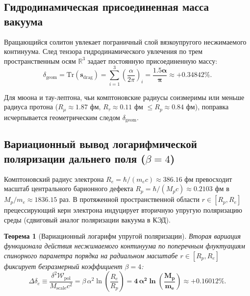 \documentclass[12pt,a4paper]{article}
\newtheorem{theorem}{Теорема}
\begin{document}
	\subsection{Гидродинамическая присоединенная масса вакуума}
	Вращающийся солитон увлекает пограничный слой вязкоупругого несжимаемого континуума. След тензора гидродинамического увлечения по трем пространственным осям $\mathbb{R}^3$ задает постоянную присоединенную массу:
	\begin{equation}
		\delta_{\text{geom}} = \mathrm{Tr}(\mathbf{s}_{\text{drag}}) = \sum_{i=1}^3 \left(\frac{\alpha}{2\pi}\right)_i = \mathbf{\frac{1.5 \alpha}{\pi}} \approx \mathbf{+0.34842\%}.
	\end{equation}
	
	Для мюона и тау-лептона, чьи комптоновские радиусы соизмеримы или меньше радиуса протона ($R_\mu \approx 1.87$ фм, $R_\tau \approx 0.11$ фм $\le R_p \approx 0.84$ фм), поправка исчерпывается геометрическим следом $\delta_{\text{geom}}$.
	
	
	\subsection{Вариационный вывод логарифмической поляризации дальнего поля ($\beta = 4$)}
	
	Комптоновский радиус электрона $R_e = \hbar / (m_e c) \approx 386.16$ фм превосходит масштаб центрального барионного дефекта $R_p = \hbar / (M_p c) \approx 0.2103$ фм в $M_p/m_e \approx 1836.15$ раз. В протяженной пространственной области $r \in [R_p, R_e]$ прецессирующий керн электрона индуцирует вторичную упругую поляризацию среды (сдвиговый аналог поляризации вакуума в КЭД).
	
	\begin{theorem}[Вариационный логарифм упругой поляризации]
		Вторая вариация функционала действия несжимаемого континуума по поперечным флуктуациям спинорного параметра порядка на радиальном масштабе $r \in [R_p, R_e]$ фиксирует безразмерный коэффициент $\beta = 4$:
		\begin{equation}
			\Delta \delta_e \equiv \frac{\delta^2 \mathcal{W}_{\mathrm{pol}}}{M_{\mathrm{scale}} c^2} = \beta \, \alpha^2 \ln\left( \frac{R_e}{R_p} \right) = \mathbf{4 \, \alpha^2 \ln\left( \frac{M_p}{m_e} \right)} \approx \mathbf{+0.16012\%}.
		\end{equation}
	\end{theorem}
	
\end{document}
